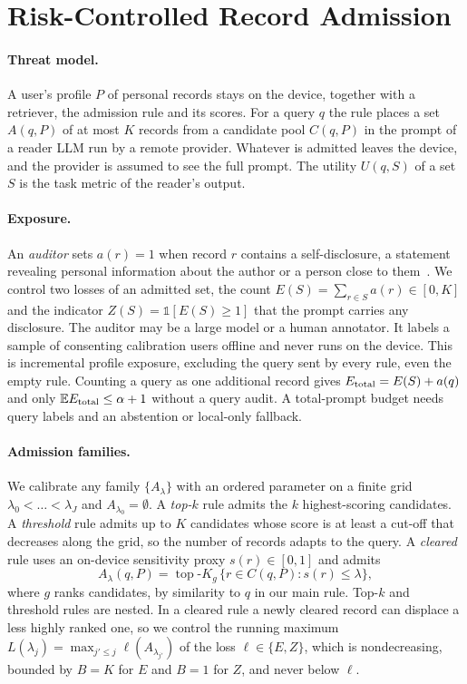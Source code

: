 \section{Risk-Controlled Record Admission}
\label{sec:method}

\paragraph{Threat model.}
A user's profile $P$ of personal records stays on the device, together with
a retriever, the admission rule and its scores. For a query $q$ the rule
places a set $A(q,P)$ of at most $K$ records from a candidate pool $C(q,P)$
in the prompt of a reader LLM run by a remote provider. Whatever is admitted
leaves the device, and the provider is assumed to see the full prompt. The
utility $U(q,S)$ of a set $S$ is the task metric of the reader's output.

\paragraph{Exposure.}
An \emph{auditor} sets $a(r)=1$ when record $r$ contains a self-disclosure,
a statement revealing personal information about the author or a person close
to them~\cite{dou2024reducing}. We control two losses of an admitted set, the
count $E(S)=\sum_{r\in S}a(r)\in[0,K]$ and the indicator
$Z(S)=\mathbb{1}[E(S)\ge1]$ that the prompt carries any disclosure. The
auditor may be a large model or a human annotator. It labels a sample of
consenting calibration users offline and never runs on the device.
This is incremental profile exposure, excluding the query sent by every
rule, even the empty rule. Counting a query as one additional record gives
$E_{\rm total}=E(S)+a(q)$ and only $\mathbb{E}E_{\rm total}\le\alpha+1$
without a query audit. A total-prompt budget needs query labels and an
abstention or local-only fallback.

\paragraph{Admission families.}
We calibrate any family $\{A_\lambda\}$ with an ordered parameter on a finite
grid $\lambda_0<\dots<\lambda_J$ and $A_{\lambda_0}=\emptyset$. A
\emph{top-$k$} rule admits the $k$ highest-scoring candidates. A
\emph{threshold} rule admits up to $K$ candidates whose score is at least a
cut-off that decreases along the grid, so the number of records adapts to
the query. A \emph{cleared} rule uses an on-device sensitivity proxy
$s(r)\in[0,1]$ and admits
\begin{equation}
A_\lambda(q,P)=\operatorname{top}\text{-}K_{g}\,\{r\in C(q,P): s(r)\le\lambda\},
\label{eq:gate}
\end{equation}
where $g$ ranks candidates, by similarity to $q$ in our main rule. Top-$k$
and threshold rules are nested. In a cleared rule a newly cleared record can
displace a less highly ranked one, so we control the running maximum
$L(\lambda_j)=\max_{j'\le j}\ell(A_{\lambda_{j'}})$ of the loss $\ell\in\{E,Z\}$,
which is nondecreasing, bounded by $B=K$ for $E$ and $B=1$ for $Z$, and never
below $\ell$.

